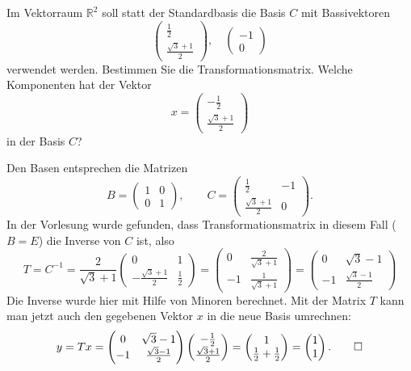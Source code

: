 Im Vektorraum $\mathbb R^2$ soll statt der Standardbasis die Basis $C$ mit
Bassivektoren
\[
\begin{pmatrix}
\frac12\\
\frac{\sqrt{3}+1}2
\end{pmatrix},\quad
\begin{pmatrix}
-1\\
0
\end{pmatrix}
\]
verwendet werden.
Bestimmen Sie die Transformationsmatrix.
Welche Komponenten hat der Vektor
\[
x=
\begin{pmatrix}
-\frac12\\
\frac{\sqrt{3}+1}2
\end{pmatrix}
\]
in der Basis $C$?


\begin{loesung}
Den Basen entsprechen die Matrizen
\[
B=\begin{pmatrix}1&0\\0&1\end{pmatrix},\qquad
C=\begin{pmatrix}
\frac12&-1\\
\frac{\sqrt{3}+1}2&0
\end{pmatrix}.
\]
In der Vorlesung wurde gefunden, dass Transformationsmatrix in diesem
Fall ($B=E$) die Inverse von $C$ ist, also
\[
T=C^{-1}=\frac2{\sqrt{3}+1}\begin{pmatrix}
0&1\\
-\frac{\sqrt{3}+1}2&\frac12
\end{pmatrix}
=\begin{pmatrix}
0&\frac{2}{\sqrt{3}+1}\\
-1&\frac1{\sqrt{3}+1}
\end{pmatrix}
=
\begin{pmatrix}
0&\sqrt{3}-1\\
-1&\frac{\sqrt{3}-1}{2}
\end{pmatrix}
\]
Die Inverse wurde hier mit Hilfe von Minoren berechnet.
Mit der Matrix $T$ kann man jetzt auch den gegebenen Vektor $x$  in
die neue Basis umrechnen:
\[
y=
Tx
=
\begin{pmatrix}
0&\sqrt{3}-1\\
-1&\frac{\sqrt{3}-1}{2}
\end{pmatrix}
\begin{pmatrix}
-\frac12\\
\frac{\sqrt{3}+1}2
\end{pmatrix}
=
\begin{pmatrix}1\\
\frac12+\frac12\end{pmatrix}
=\begin{pmatrix}1\\1\end{pmatrix}.
\qedhere
\]
\end{loesung}

